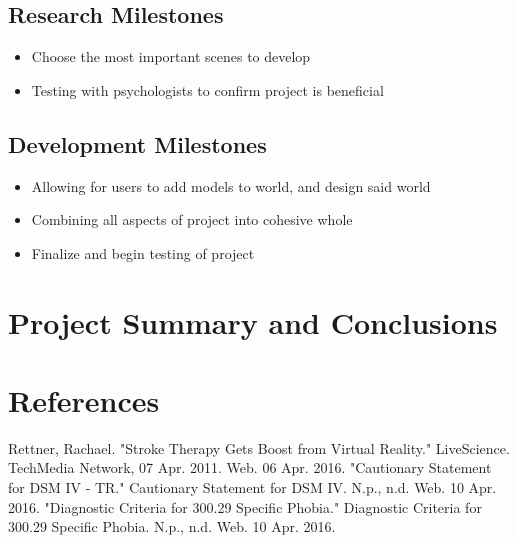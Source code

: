 \documentclass[a4paper,10pt,twoside]{article}
\begin{document}
	\subsection{Research Milestones}
		\begin{itemize}
			\item Choose the most important scenes to develop
			\item Testing with psychologists to confirm project is beneficial
		\end{itemize}
	\subsection{Development Milestones}
		\begin{itemize}
			\item Allowing for users to add models to world, and design said world
			\item Combining all aspects of project into cohesive whole
			\item Finalize and begin testing of project
		\end{itemize}
	

\pagebreak
\section{Project Summary and Conclusions}

\pagebreak
{}
\setcounter{page}{1}
\section{References}


\begin{thebibliography}{9}
Rettner, Rachael. "Stroke Therapy Gets Boost from Virtual Reality." LiveScience. TechMedia Network, 07 Apr. 2011. Web. 06 Apr. 2016.
"Cautionary Statement for DSM IV - TR." Cautionary Statement for DSM IV. N.p., n.d. Web. 10 Apr. 2016.
"Diagnostic Criteria for 300.29 Specific Phobia." Diagnostic Criteria for 300.29 Specific Phobia. N.p., n.d. Web. 10 Apr. 2016.
\end{thebibliography}
\end{document}
